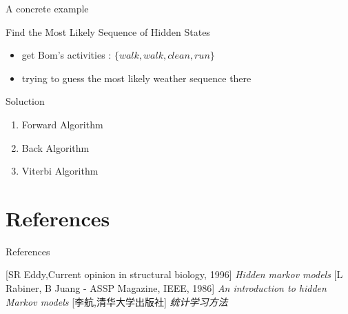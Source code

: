\documentclass{beamer}
\begin{document}
\begin{frame}{A concrete example}
    \begin{block}{Find the Most Likely Sequence of Hidden States}
    \begin{itemize}
    \item get Bom's activities : $\{ walk, walk, clean, run  \}$
    \item trying to guess the most likely weather sequence there
    \end{itemize}
    \end{block}

    \begin{block}{Soluction}
    \begin{enumerate}
    \item Forward Algorithm
    \item Back Algorithm
    \item Viterbi Algorithm
    \end{enumerate}
    \end{block}
    
\end{frame}

\section{References}
\begin{frame}{References}
\begin{thebibliography}{10}
 [SR Eddy,Current opinion in structural biology, 1996]
    \newblock \emph{Hidden markov models}
 [L Rabiner, B Juang - ASSP Magazine, IEEE, 1986]
    \newblock \emph{An introduction to hidden Markov models}
 [李航,清华大学出版社]
    \newblock \emph{统计学习方法}
\end{thebibliography}
\end{frame}
\end{document}
